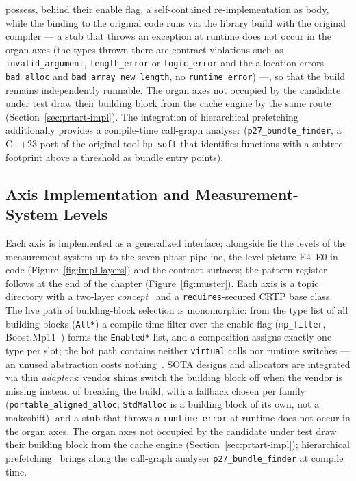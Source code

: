 \begin{nurlang}
possess, behind their enable flag, a self-contained re-implementation as body, while the binding to the
original code runs via the library build with the original compiler --- a stub that throws an exception
at runtime does not occur in the organ axes (the types thrown there are contract violations such as
\texttt{invalid\_argument}, \texttt{length\_error} or \texttt{logic\_error} and the allocation errors
\texttt{bad\_alloc} and \texttt{bad\_array\_new\_length}, no \texttt{runtime\_error}) ---, so that the
build remains independently runnable. The organ axes not occupied by the candidate under test draw their building
block from the cache engine by the same route (Section~\ref{sec:prtart-impl}). The integration of
hierarchical prefetching~\cite{zhang2025hierarchical} additionally provides a compile-time call-graph
analyser (\texttt{p27\_bundle\_finder}, a C++23 port of the original tool \texttt{hp\_soft} that
identifies functions with a subtree footprint above a threshold as bundle entry points).
\end{nurlang}
\begin{nurkurz}
\section{Axis Implementation and Measurement-System Levels}\label{sec:axes-impl}
Each axis is implemented as a generalized interface; alongside lie the levels of the measurement system
up to the seven-phase pipeline, the level picture E4--E0 in code (Figure~\ref{fig:impl-layers}) and the
contract surfaces; the pattern register follows at the end of the chapter (Figure~\ref{fig:muster}).
Each axis is a topic directory with a two-layer \emph{concept}~\cite{sutton2012concepts} and a
\texttt{requires}-secured CRTP base class. The live path of building-block selection is monomorphic:
from the type list of all building blocks (\texttt{All*}) a compile-time filter over the enable flag
(\texttt{mp\_filter}, Boost.Mp11~\cite{dimov_mp11}) forms the \texttt{Enabled*} list, and a composition
assigns exactly one type per slot; the hot path contains neither \texttt{virtual} calls nor runtime
switches --- an unused abstraction costs nothing~\cite{stroustrup2012foundations}. SOTA designs and
allocators are integrated via thin \emph{adapters}: vendor shims switch the building block off when the
vendor is missing instead of breaking the build, with a fallback chosen per family
(\texttt{portable\_aligned\_alloc}; \texttt{StdMalloc} is a building block of its own, not a makeshift),
and a stub that throws a \texttt{runtime\_error} at runtime does not occur in the organ axes. The organ
axes not occupied by the candidate under test draw their building block from the cache engine
(Section~\ref{sec:prtart-impl}); hierarchical prefetching~\cite{zhang2025hierarchical} brings along the
call-graph analyser \texttt{p27\_bundle\_finder} at compile time.
\end{nurkurz}

